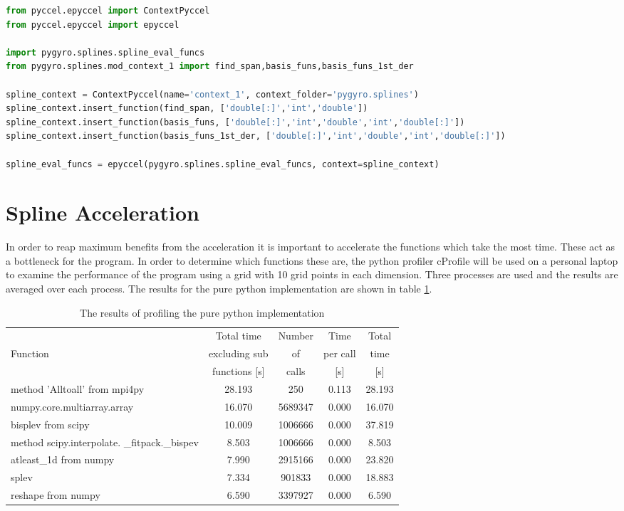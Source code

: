 \begin{lstlisting}[language=python,style=pythonStyle]
from pyccel.epyccel import ContextPyccel
from pyccel.epyccel import epyccel

import pygyro.splines.spline_eval_funcs
from pygyro.splines.mod_context_1 import find_span,basis_funs,basis_funs_1st_der

spline_context = ContextPyccel(name='context_1', context_folder='pygyro.splines')
spline_context.insert_function(find_span, ['double[:]','int','double'])
spline_context.insert_function(basis_funs, ['double[:]','int','double','int','double[:]'])
spline_context.insert_function(basis_funs_1st_der, ['double[:]','int','double','int','double[:]'])

spline_eval_funcs = epyccel(pygyro.splines.spline_eval_funcs, context=spline_context)
\end{lstlisting}


\section{Spline Acceleration}

In order to reap maximum benefits from the acceleration it is important to accelerate the functions which take the most time. These act as a bottleneck for the program. In order to determine which functions these are, the python profiler cProfile will be used on a personal laptop to examine the performance of the program using a grid with 10 grid points in each dimension. Three processes are used and the results are averaged over each process. The results for the pure python implementation are shown in table \ref{tab::pure python profile}.

\begin{table}[ht]
 \begin{tabular}{|m{}|c|c|c|c|}
  \hline
          & Total time & Number & Time & Total \\
  Function & excluding sub & of & per call & time \\
          & functions [s] & calls & [s] & [s] \\
  \hline
  \hline
  method 'Alltoall' from mpi4py & 28.193 & 250 & 0.113 & 28.193 \\
  \hline
  numpy.core.multiarray.array & 16.070 & 5689347 & 0.000 & 16.070 \\
  \hline
  bisplev from scipy & 10.009 & 1006666 & 0.000 & 37.819\\
  \hline
  method scipy.interpolate. \_fitpack.\_bispev & 8.503 & 1006666 & 0.000 & 8.503\\
  \hline
  atleast\_1d from numpy & 7.990 & 2915166 & 0.000 & 23.820\\
  \hline
  splev & 7.334 & 901833 & 0.000 & 18.883\\
  \hline
  reshape from numpy & 6.590 & 3397927 & 0.000 & 6.590\\
  \hline
 \end{tabular}
\caption{\label{tab::pure python profile} The results of profiling the pure python implementation}
\end{table}

